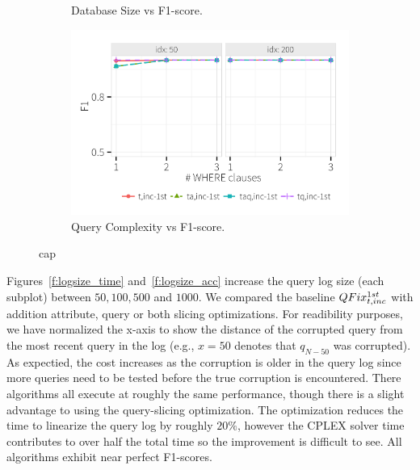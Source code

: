 \begin{figure}[h]
\begin{subfigure}[t]{.3\textwidth}
      \vspace*{-.1in}
      \caption{Database Size vs F1-score. }
      \label{f:dbsize_acc} 
    \end{subfigure}
    \begin{subfigure}[t]{.3\textwidth}
      \includegraphics[width = .95\columnwidth]{figures/where_acc}
      \vspace*{-.1in}
      \caption{Query Complexity vs F1-score.}
      \label{f:where_acc} 
    \end{subfigure}
    \caption{cap}
  \end{figure}



Figures~\ref{f:logsize_time} and~\ref{f:logsize_acc} increase the query log size (each subplot) between $50, 100, 500$ and $1000$.
We compared the baseline $QFix_{t,inc}^{1st}$ with addition attribute, query or both slicing optimizations.
For readibility purposes, we have normalized the x-axis to show the distance of the corrupted query from the most recent query in the log
(e.g., $x=50$ denotes that $q_{N-50}$ was corrupted).
As expectied, the cost increases as the corruption is older in the query log since more queries need to be tested before the
true corruption is encountered.  There algorithms all execute at roughly the same performance, though there is a slight advantage to
using the query-slicing optimization. The optimization reduces the time to linearize the query log by roughly $20\%$, however
the CPLEX solver time contributes to over half the total time so the improvement is difficult to see.
All algorithms exhibit near perfect F1-scores.



